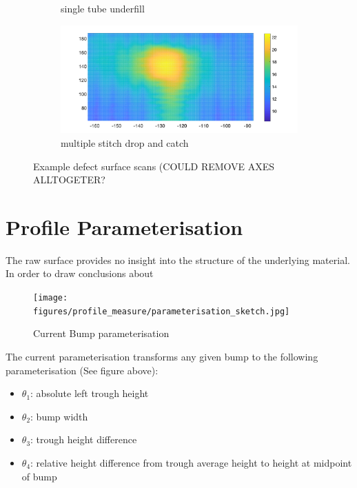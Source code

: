 \documentclass[12pt]{report}
\begin{document}
\begin{figure}[h!]
\begin{subfigure}{0.5\textwidth}
        \caption{single tube underfill}
        \label{fig:calib_line}
    \end{subfigure}
    \begin{subfigure}{0.5\textwidth}
        \centering
        \includegraphics[width=\linewidth]{figures/profile_measure/fbs_06_01_top.pdf}  
        \caption{multiple stitch drop and catch}
        \label{fig:calib_line}
    \end{subfigure}
    \caption{Example defect surface scans (COULD REMOVE AXES ALLTOGETER?}
    \label{fig:rot_correction}
\end{figure}

\newpage

    
\section{Profile Parameterisation}

The raw surface provides no insight into the structure of the underlying material. In order to draw conclusions about

\begin{figure}
    \centering
    \texttt{[image: figures/profile\_measure/parameterisation\_sketch.jpg]}
    \caption{Current Bump parameterisation}
\end{figure}
The current parameterisation transforms any given bump to the following parameterisation (See figure above):
\begin{itemize}
    \item $\theta_1$: absolute left trough height
    \item $\theta_2$: bump width
    \item $\theta_3$: trough height difference
    \item $\theta_4$: relative height difference from trough average height to height at midpoint of bump 
\end{itemize}
\end{document}
